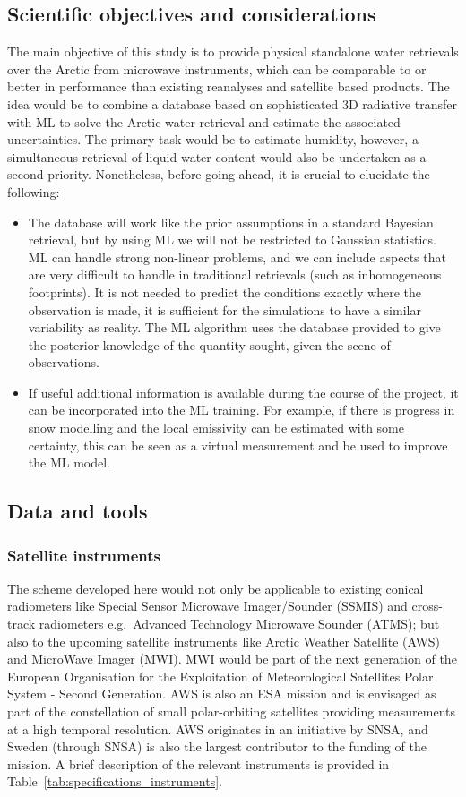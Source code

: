 \documentclass[12pt,oneside,a4paper]{article}
\begin{document}
\subsection{Scientific objectives and considerations}
The main objective of this study is to provide physical standalone water retrievals over the Arctic from microwave instruments, which can be comparable to or better in performance than existing reanalyses and satellite based products. The idea would be to combine a database based on sophisticated 3D radiative transfer with ML to solve the Arctic water retrieval and estimate the associated uncertainties. The primary task would be to estimate humidity, however, a simultaneous retrieval of liquid water content would also be undertaken as a second priority.
Nonetheless, before going ahead, it is crucial to elucidate the following:
\begin{itemize}
\item  The database will work like the prior assumptions in a standard Bayesian retrieval, but by using ML we will not be restricted to Gaussian statistics. ML can handle strong non-linear problems, and we can include aspects that are very difficult to handle in traditional retrievals (such as inhomogeneous footprints). It is not needed to predict the conditions exactly where the observation is made, it is sufficient for the simulations to have a similar variability as reality. The ML algorithm uses the database provided to give the posterior knowledge of the quantity sought, given the scene of observations.
\item  If useful additional information is available during the course of the project, it can be incorporated into the ML training. For example, if there is progress in snow modelling and the local emissivity can be estimated with some certainty, this can be seen as a virtual measurement and be used to improve the ML model. 
\end{itemize}

\subsection{Data and tools}
% 
\subsubsection{Satellite instruments}

The scheme developed here would not only be applicable to existing conical radiometers like  Special Sensor Microwave Imager/Sounder (SSMIS) and cross-track radiometers e.g.\, Advanced Technology Microwave Sounder (ATMS); but also to the upcoming satellite instruments like Arctic Weather Satellite (AWS) and MicroWave Imager (MWI). MWI would be part of the next generation of the European Organisation for the Exploitation of Meteorological Satellites Polar System - Second Generation. AWS is also an ESA mission and is envisaged as part of the constellation of small polar-orbiting satellites providing measurements at a high temporal resolution. AWS originates in an initiative by SNSA, and Sweden (through SNSA) is also the largest contributor to the funding of the mission. A brief description of the relevant instruments is provided in Table~\ref{tab:specifications_instruments}. 
\end{document}
